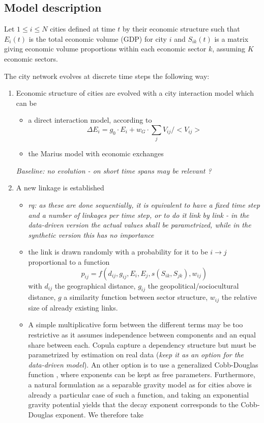 \documentclass{article}
\begin{document}
\subsection{Model description}

Let $1 \leq i \leq N$ cities defined at time $t$ by their economic structure such that $E_i(t)$ is the total economic volume (GDP) for city $i$ and $S_{ik}(t)$ is a matrix giving economic volume proportions within each economic sector $k$, assuming $K$ economic sectors.


The city network evolves at discrete time steps the following way:
\begin{enumerate}
    \item Economic structure of cities are evolved with a city interaction model which can be
    \begin{itemize}
        \item a direct interaction model, according to
        \begin{equation}
            \Delta E_i = g_0\cdot E_i + w_G \cdot \sum_j V_{ij}/<V_{ij}>
        \end{equation}
        \item the Marius model with economic exchanges
    \end{itemize}
    \textit{Baseline: no evolution - on short time spans may be relevant ?}
    \item A new linkage is established
    \begin{itemize}
        \item \textit{rq: as these are done sequentially, it is equivalent to have a fixed time step and a number of linkages per time step, or to do it link by link - in the data-driven version the actual values shall be parametrized, while in the synthetic version this has no importance}
        \item the link is drawn randomly with a probability for it to be $i \rightarrow j$ proportional to a function
    \begin{equation}
        p_{ij} = f(d_{ij},g_{ij},E_i,E_j,s(S_{ik},S_{jk}),w_{ij})
    \end{equation}
    with $d_{ij}$ the geographical distance, $g_{ij}$ the geopolitical/sociocultural distance, $g$ a similarity function between sector structure, $w_{ij}$ the relative size of already existing links.
    \item A simple multiplicative form between the different terms may be too restrictive as it assumes independence between components and an equal share between each. Copula capture a dependency structure but must be parametrized by estimation on real data (\textit{keep it as an option for the data-driven model}). An other option is to use a generalized Cobb-Douglas function \citep{vilcu2011geometric}, where exponents can be kept as free parameters. Furthermore, a natural formulation as a separable gravity model as for cities above is already a particular case of such a function, and taking an exponential gravity potential yields that the decay exponent corresponds to the Cobb-Douglas exponent. We therefore take

\end{itemize}
\end{enumerate}
\end{document}
